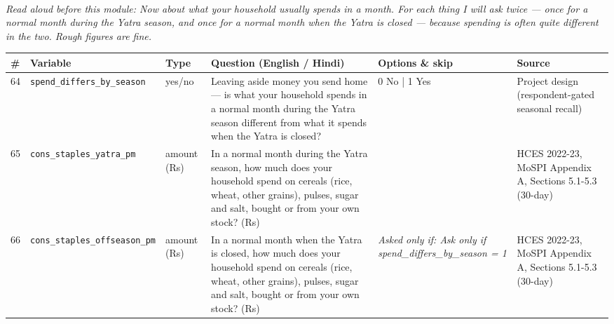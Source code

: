 \documentclass[9pt,a4paper,landscape]{article}
\begin{document}
\\[3pt]
{\small\itshape Read aloud before this module: Now about what your household usually spends in a month. For each thing I will ask twice — once for a normal month during the Yatra season, and once for a normal month when the Yatra is closed — because spending is often quite different in the two. Rough figures are fine.}\\[5pt]
\begin{longtable}{@{}p{0.5cm}p{3.3cm}p{1.7cm}p{7.3cm}p{5.6cm}p{5.4cm}@{}}
\toprule \footnotesize\textbf{\#} & \footnotesize\textbf{Variable} & \footnotesize\textbf{Type} & \footnotesize\textbf{Question (English / Hindi)} & \footnotesize\textbf{Options {\&} skip} & \footnotesize\textbf{Source}\\ \midrule
\endhead
\footnotesize 64 & \footnotesize\texttt{spend\_differs\_by\_season} & \scriptsize yes/no & \footnotesize Leaving aside money you send home — is what your household spends in a normal month during the Yatra season different from what it spends when the Yatra is closed?\par\vspace{1pt}{\footnotesize\color{hdr}{\hifont घर भेजे जाने वाले पैसे को छोड़कर — यात्रा के मौसम में आपके घर का महीने का ख़र्च, और जब यात्रा बंद रहती है तब का ख़र्च, क्या अलग-अलग होता है?}} & \scriptsize 0 No | 1 Yes & \scriptsize Project design (respondent-gated seasonal recall)\\
\footnotesize 65 & \footnotesize\texttt{cons\_staples\_yatra\_pm} & \scriptsize amount (Rs) & \footnotesize In a normal month during the Yatra season, how much does your household spend on cereals (rice, wheat, other grains), pulses, sugar and salt, bought or from your own stock? (Rs)\par\vspace{1pt}{\footnotesize\color{hdr}{\hifont यात्रा के मौसम के आम महीने में, आप (और जो यहाँ आपके साथ रहते हैं) अनाज (चावल, गेहूँ, दूसरा अनाज), दाल, चीनी और नमक पर, ख़रीदा हुआ या अपने घर का कितना ख़र्च करते हैं? (रुपये)}} & \scriptsize  & \scriptsize HCES 2022-23, MoSPI Appendix A, Sections 5.1-5.3 (30-day)\\
\footnotesize 66 & \footnotesize\texttt{cons\_staples\_offseason\_pm} & \scriptsize amount (Rs) & \footnotesize In a normal month when the Yatra is closed, how much does your household spend on cereals (rice, wheat, other grains), pulses, sugar and salt, bought or from your own stock? (Rs)\par\vspace{1pt}{\footnotesize\color{hdr}{\hifont जब यात्रा बंद रहती है, उस आम महीने में आपका घर अनाज (चावल, गेहूँ, दूसरा अनाज), दाल, चीनी और नमक पर, ख़रीदा हुआ या अपने घर का कितना ख़र्च करता है? (रुपये)}} & \scriptsize \textit{Asked only if: Ask only if spend\_differs\_by\_season = 1} & \scriptsize HCES 2022-23, MoSPI Appendix A, Sections 5.1-5.3 (30-day)\\

\end{longtable}
\end{document}
